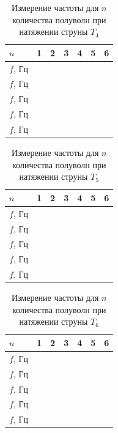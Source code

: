 \documentclass[a4paper,12pt]{article} %
\begin{document}
\begin{table}[h]
\centering
\begin{tabular}{|p{1cm}|p{1cm}|p{1cm}|p{1cm}|p{1cm}|p{1cm}|p{1cm}|}

\hline
$n$ & 1 & 2 & 3 & 4 & 5 & 6\\ \hline
$f$, Гц & & & & & &\\ \hline
$f$, Гц & & & & & &\\ \hline
$f$, Гц & & & & & &\\ \hline
$f$, Гц & & & & & &\\ \hline
$f$, Гц & & & & & &\\ \hline
\end{tabular}
\caption{Измерение частоты для $n$ количества полуволн при натяжении струны $T_4$}
\end{table}
\begin{table}[h]
\centering
\begin{tabular}{|p{1cm}|p{1cm}|p{1cm}|p{1cm}|p{1cm}|p{1cm}|p{1cm}|}

\hline
$n$ & 1 & 2 & 3 & 4 & 5 & 6\\ \hline
$f$, Гц & & & & & &\\ \hline
$f$, Гц & & & & & &\\ \hline
$f$, Гц & & & & & &\\ \hline
$f$, Гц & & & & & &\\ \hline
$f$, Гц & & & & & &\\ \hline
\end{tabular}
\caption{Измерение частоты для $n$ количества полуволн при натяжении струны $T_5$}
\end{table}
\begin{table}[h]
\centering
\begin{tabular}{|p{1cm}|p{1cm}|p{1cm}|p{1cm}|p{1cm}|p{1cm}|p{1cm}|}

\hline
$n$ & 1 & 2 & 3 & 4 & 5 & 6\\ \hline
$f$, Гц & & & & & &\\ \hline
$f$, Гц & & & & & &\\ \hline
$f$, Гц & & & & & &\\ \hline
$f$, Гц & & & & & &\\ \hline
$f$, Гц & & & & & &\\ \hline
\end{tabular}
\caption{Измерение частоты для $n$ количества полуволн при натяжении струны $T_6$}
\end{table}
\end{document}

